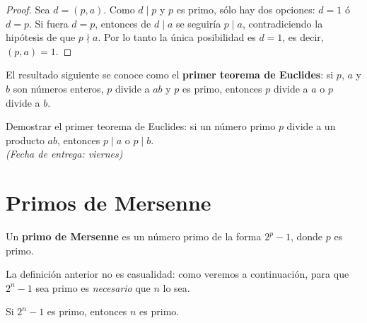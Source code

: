 \documentclass[12pt,a4paper]{book}
\begin{document}
  \begin{proof}
    Sea $d=(p,a)$. Como $d\mid p$ y $p$ es primo, sólo hay dos opciones: $d=1$ ó $d=p$. Si fuera $d=p$, entonces de $d\mid a$ se seguiría $p\mid a$, contradiciendo la hipótesis de que $p\nmid a$. Por lo tanto la única posibilidad es $d=1$, es decir, $(p,a)=1$.
  \end{proof}
  
  El resultado siguiente se conoce como el \textbf{primer teorema de Euclides}: si $p$, $a$ y $b$ son números enteros, $p$ divide a $ab$ y $p$ es primo, entonces $p$ divide a $a$ o $p$ divide a $b$.
  
  \begin{ejemplo}
    Demostrar el primer teorema de Euclides: si un número primo $p$ divide a un producto $ab$, entonces $p\mid a$ o $p\mid b$. \\
    \emph{(Fecha de entrega: viernes)}
  \end{ejemplo}
  
  \section{Primos de Mersenne}
  
  \begin{definicion}
    Un \textbf{primo de Mersenne} es un número primo de la forma $2^p-1$, donde $p$ es primo.
  \end{definicion}
  
  La definición anterior no es casualidad: como veremos a continuación, para que $2^n-1$ sea primo es \emph{necesario} que $n$ lo sea.
  
  \begin{teorema}
    Si $2^n-1$ es primo, entonces $n$ es primo.
  \end{teorema}
  
\end{document}
